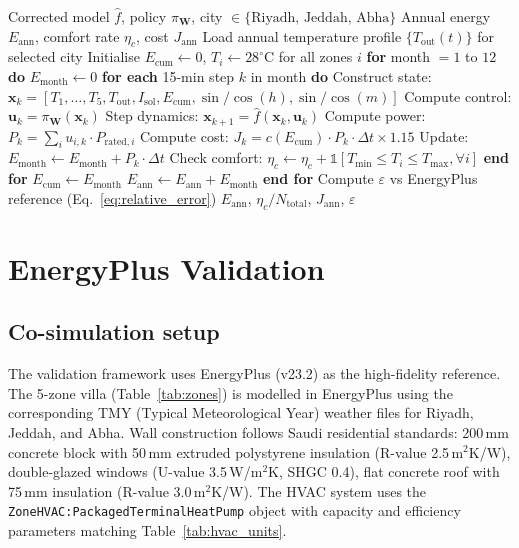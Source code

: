 \documentclass[12pt]{article}
\theoremstyle{plain}
\theoremstyle{definition}
\begin{document}
\begin{algorithm}[H]
\caption{Training and Evaluation Procedure}\label{alg:training}
\begin{algorithmic}[1]
\REQUIRE Corrected model $\hat{f}$, policy $\pi_{\mathbf{W}}$, city $\in \{\text{Riyadh, Jeddah, Abha}\}$
\ENSURE Annual energy $E_{\text{ann}}$, comfort rate $\eta_c$, cost $J_{\text{ann}}$
\STATE Load annual temperature profile $\{T_{\text{out}}(t)\}$ for selected city
\STATE Initialise $E_{\text{cum}} \leftarrow 0$, $T_i \leftarrow 28^\circ$C for all zones $i$
\STATE \textbf{for} month $= 1$ to $12$ \textbf{do}
\STATE \quad $E_{\text{month}} \leftarrow 0$
\STATE \quad \textbf{for each} 15-min step $k$ in month \textbf{do}
\STATE \quad \quad Construct state: $\mathbf{x}_k = [T_1,\ldots,T_5, T_{\text{out}}, I_{\text{sol}}, E_{\text{cum}}, \sin/\cos(h), \sin/\cos(m)]$
\STATE \quad \quad Compute control: $\mathbf{u}_k = \pi_{\mathbf{W}}(\mathbf{x}_k)$
\STATE \quad \quad Step dynamics: $\mathbf{x}_{k+1} = \hat{f}(\mathbf{x}_k, \mathbf{u}_k)$
\STATE \quad \quad Compute power: $P_k = \sum_i u_{i,k} \cdot P_{\text{rated},i}$
\STATE \quad \quad Compute cost: $J_k = c(E_{\text{cum}}) \cdot P_k \cdot \Delta t \times 1.15$
\STATE \quad \quad Update: $E_{\text{month}} \leftarrow E_{\text{month}} + P_k \cdot \Delta t$
\STATE \quad \quad Check comfort: $\eta_c \leftarrow \eta_c + \mathbb{1}[T_{\min} \leq T_i \leq T_{\max}, \forall i]$
\STATE \quad \textbf{end for}
\STATE \quad $E_{\text{cum}} \leftarrow E_{\text{month}}$ 
\STATE \quad $E_{\text{ann}} \leftarrow E_{\text{ann}} + E_{\text{month}}$
\STATE \textbf{end for}
\STATE Compute $\varepsilon$ vs EnergyPlus reference (Eq.~\ref{eq:relative_error})
\RETURN $E_{\text{ann}}$, $\eta_c / N_{\text{total}}$, $J_{\text{ann}}$, $\varepsilon$
\end{algorithmic}
\end{algorithm}

\section{EnergyPlus Validation}\label{sec:validation}

\subsection{Co-simulation setup}

The validation framework uses EnergyPlus (v23.2) as the high-fidelity reference. The 5-zone villa (Table~\ref{tab:zones}) is modelled in EnergyPlus using the corresponding TMY (Typical Meteorological Year) weather files for Riyadh, Jeddah, and Abha. Wall construction follows Saudi residential standards: 200\,mm concrete block with 50\,mm extruded polystyrene insulation (R-value 2.5\,m$^2$K/W), double-glazed windows (U-value 3.5\,W/m$^2$K, SHGC 0.4), flat concrete roof with 75\,mm insulation (R-value 3.0\,m$^2$K/W). The HVAC system uses the \texttt{ZoneHVAC:PackagedTerminalHeatPump} object with capacity and efficiency parameters matching Table~\ref{tab:hvac_units}.
\end{document}
